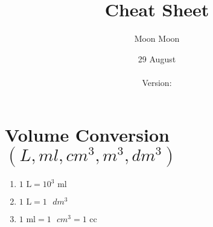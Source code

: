 \documentclass[14 pt, letterpaper]{extarticle}
\title{Cheat Sheet}
\author
{
	Moon Moon
}
\date{29 August \\ \currenttime \\ Version: \version}
\affil
{
	Azimpur Girls College \\
	{\tiny Copyright\faCopyright\hspace{2pt} under Sofiullah Book Agency}
}
\begin{document}
\pagecolor{green!90}
\maketitle
\pagebreak
\pagecolor{white}

\section*{Volume Conversion $(L, ml, cm^3, m^3, dm^3)$}
\begin{enumerate}
	\item $1\textrm{ L}=10^3\textrm{ ml}$
	\item $1\textrm{ L}=1\textrm{ }dm^3$
	\item $1\textrm{ ml}=1\textrm{ }cm^3=1\textrm{ cc}$
\end{enumerate}
\end{document}
